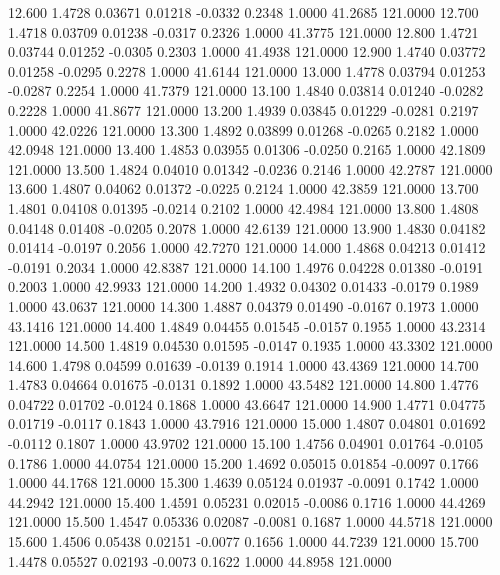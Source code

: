   12.600   1.4728   0.03671   0.01218  -0.0332   0.2348   1.0000  41.2685 121.0000
  12.700   1.4718   0.03709   0.01238  -0.0317   0.2326   1.0000  41.3775 121.0000
  12.800   1.4721   0.03744   0.01252  -0.0305   0.2303   1.0000  41.4938 121.0000
  12.900   1.4740   0.03772   0.01258  -0.0295   0.2278   1.0000  41.6144 121.0000
  13.000   1.4778   0.03794   0.01253  -0.0287   0.2254   1.0000  41.7379 121.0000
  13.100   1.4840   0.03814   0.01240  -0.0282   0.2228   1.0000  41.8677 121.0000
  13.200   1.4939   0.03845   0.01229  -0.0281   0.2197   1.0000  42.0226 121.0000
  13.300   1.4892   0.03899   0.01268  -0.0265   0.2182   1.0000  42.0948 121.0000
  13.400   1.4853   0.03955   0.01306  -0.0250   0.2165   1.0000  42.1809 121.0000
  13.500   1.4824   0.04010   0.01342  -0.0236   0.2146   1.0000  42.2787 121.0000
  13.600   1.4807   0.04062   0.01372  -0.0225   0.2124   1.0000  42.3859 121.0000
  13.700   1.4801   0.04108   0.01395  -0.0214   0.2102   1.0000  42.4984 121.0000
  13.800   1.4808   0.04148   0.01408  -0.0205   0.2078   1.0000  42.6139 121.0000
  13.900   1.4830   0.04182   0.01414  -0.0197   0.2056   1.0000  42.7270 121.0000
  14.000   1.4868   0.04213   0.01412  -0.0191   0.2034   1.0000  42.8387 121.0000
  14.100   1.4976   0.04228   0.01380  -0.0191   0.2003   1.0000  42.9933 121.0000
  14.200   1.4932   0.04302   0.01433  -0.0179   0.1989   1.0000  43.0637 121.0000
  14.300   1.4887   0.04379   0.01490  -0.0167   0.1973   1.0000  43.1416 121.0000
  14.400   1.4849   0.04455   0.01545  -0.0157   0.1955   1.0000  43.2314 121.0000
  14.500   1.4819   0.04530   0.01595  -0.0147   0.1935   1.0000  43.3302 121.0000
  14.600   1.4798   0.04599   0.01639  -0.0139   0.1914   1.0000  43.4369 121.0000
  14.700   1.4783   0.04664   0.01675  -0.0131   0.1892   1.0000  43.5482 121.0000
  14.800   1.4776   0.04722   0.01702  -0.0124   0.1868   1.0000  43.6647 121.0000
  14.900   1.4771   0.04775   0.01719  -0.0117   0.1843   1.0000  43.7916 121.0000
  15.000   1.4807   0.04801   0.01692  -0.0112   0.1807   1.0000  43.9702 121.0000
  15.100   1.4756   0.04901   0.01764  -0.0105   0.1786   1.0000  44.0754 121.0000
  15.200   1.4692   0.05015   0.01854  -0.0097   0.1766   1.0000  44.1768 121.0000
  15.300   1.4639   0.05124   0.01937  -0.0091   0.1742   1.0000  44.2942 121.0000
  15.400   1.4591   0.05231   0.02015  -0.0086   0.1716   1.0000  44.4269 121.0000
  15.500   1.4547   0.05336   0.02087  -0.0081   0.1687   1.0000  44.5718 121.0000
  15.600   1.4506   0.05438   0.02151  -0.0077   0.1656   1.0000  44.7239 121.0000
  15.700   1.4478   0.05527   0.02193  -0.0073   0.1622   1.0000  44.8958 121.0000
